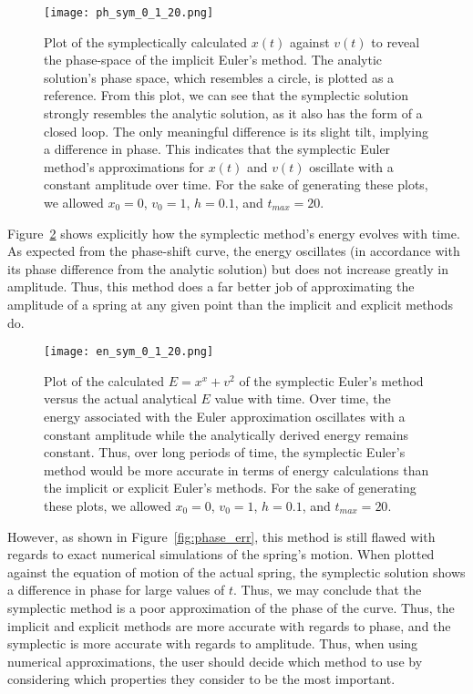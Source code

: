 \documentclass{article}
\begin{document}
\begin{figure}
    \centering
    \texttt{[image: ph\_sym\_0\_1\_20.png]}{}
    \caption{Plot of the symplectically calculated $x(t)$ against $v(t)$ to reveal the phase-space of the implicit Euler's method.  The analytic solution's phase space, which resembles a circle, is plotted as a reference.  From this plot, we can see that the symplectic solution strongly resembles the analytic solution, as it also has the form of a closed loop. The only meaningful difference is its slight tilt, implying a difference in phase.  This indicates that the symplectic Euler method's approximations for $x(t)$ and $v(t)$ oscillate with a constant amplitude over time.  For the sake of generating these plots, we allowed $x_0 = 0$, $v_0 = 1$, $h = 0.1$, and $t_{max} = 20$.}
    \label{fig:sym_pspace}
\end{figure}

Figure~\ref{fig:sym_energy} shows explicitly how the symplectic method's energy evolves with time.  As expected from the phase-shift curve, the energy oscillates (in accordance with its phase difference from the analytic solution) but does not increase greatly in amplitude.  Thus, this method does a far better job of approximating the amplitude of a spring at any given point than the implicit and explicit methods do.

\begin{figure}
    \centering
    \texttt{[image: en\_sym\_0\_1\_20.png]}{}
    \caption{Plot of the calculated $E = x^x + v^2$ of the symplectic Euler's method versus the actual analytical $E$ value with time.  Over time, the energy associated with the Euler approximation oscillates with a constant amplitude while the analytically derived energy remains constant.  Thus, over long periods of time, the symplectic Euler's method would be more accurate in terms of energy calculations than the implicit or explicit Euler's methods.  For the sake of generating these plots, we allowed $x_0 = 0$, $v_0 = 1$, $h = 0.1$, and $t_{max} = 20$.}
    \label{fig:sym_energy}
\end{figure}


However, as shown in Figure~\ref{fig:phase_err}, this method is still flawed with regards to exact numerical simulations of the spring's motion.  When plotted against the equation of motion of the actual spring, the symplectic solution shows a difference in phase for large values of $t$.  Thus, we may conclude that the symplectic method is a poor approximation of the phase of the curve.  Thus, the implicit and explicit methods are more accurate with regards to phase, and the symplectic is more accurate with regards to amplitude.  Thus, when using numerical approximations, the user should decide which method to use by considering which properties they consider to be the most important.  
\end{document}
